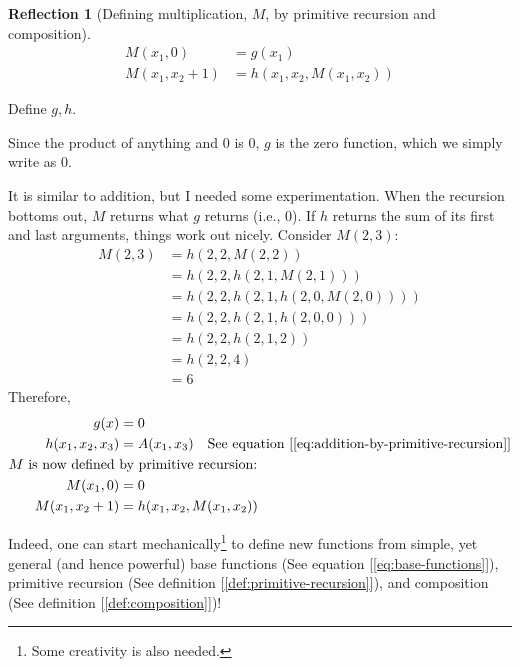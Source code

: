 \documentclass[11pt]{book}
\theoremstyle{definition}
\theoremstyle{plain}
\theoremstyle{problemstyle}
\theoremstyle{remark}
\theoremstyle{definition}
\newtheorem{reflection}{Reflection}
\begin{document}
\begin{reflection}[Defining multiplication, $M$, by primitive recursion and composition]
            \begin{equation}
                \begin{aligned}
                    M(x_1,0)&=g(x_1)\\
                    M(x_1,x_2+1)&=h(x_1,x_2,M(x_1,x_2))
                \end{aligned}
            \end{equation}

    Define $g,h$.

    Since the product of anything and $0$ is $0$, $g$ is the zero function, which we simply write as $0$.

    It is similar to addition, but I needed some experimentation. When the recursion bottoms out, $M$ returns what $g$ returns (i.e., $0$). If $h$ returns the sum of its first and last arguments, things work out nicely. Consider $M(2,3)$:
            \begin{equation}
                \begin{aligned}
                    M(2,3)&=h(2,2,M(2,2))\\
                          &=h(2,2,h(2,1,M(2,1)))\\
                          &=h(2,2,h(2,1,h(2,0,M(2,0))))\\
                          &=h(2,2,h(2,1,h(2,0,0)))\\
                          &=h(2,2,h(2,1,2))\\
                          &=h(2,2,4)\\
                          &=6
                \end{aligned}
            \end{equation}
    Therefore, 
            \begin{equation}
                \begin{aligned}
                    g(x)&=0\\
                    h(x_1,x_2,x_3)&=A(x_1,x_3)\quad\text{See equation [\ref{eq:addition-by-primitive-recursion}]}\\
                    \text{$M$ is now defined }&\text{by primitive recursion:}\\
                    M(x_1,0)&=0\\
                    M(x_1,x_2+1)&=h(x_1,x_2,M(x_1,x_2))
                \end{aligned}
            \end{equation}

    Indeed, one can start mechanically\footnote{Some creativity is also needed.} to define new functions from simple, yet general (and hence powerful) base functions (See equation [\ref{eq:base-functions}]), primitive recursion (See definition [\ref{def:primitive-recursion}]), and composition (See definition [\ref{def:composition}])! 
\end{reflection}
\end{document}
